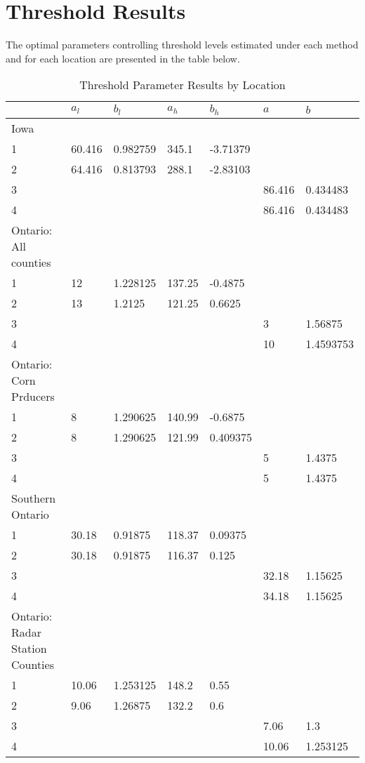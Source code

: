 \section{Threshold Results}

The optimal parameters controlling threshold levels estimated under each method and for each location are presented in the table below. 


\begin{table}[H]
\caption{Threshold Parameter Results by Location}
\label{my-label}
\begin{tabular}{lllllll}
\hline
 & $a_l$ & $b_l$ & $a_h$ & $b_h$ & $a$ & $b$ \\
\hline
 Iowa & & & & & & \\
\hline
1  & 60.416  & 0.982759   & 345.1  & -3.71379    &  & \\
2  &  64.416 & 0.813793  & 288.1         & -2.83103     & &   \\
3  &  &   &          &      & 86.416 &   0.434483 \\
4   &  &   &          &      & 86.416 &   0.434483 \\
\hline
Ontario: All counties & & & & & & \\
\hline
1  & 12 &  1.228125   & 137.25   &  -0.4875    &  & \\
2  &  13 & 1.2125  & 121.25         & 0.6625     & &   \\
3  &  &   &          &      & 3 &  1.56875 \\
4   &  &   &          &      & 10 &   1.4593753 \\
\hline
 Ontario: Corn Prducers & & & & & & \\
\hline
1  & 8 &  1.290625   & 140.99    &  -0.6875   &  & \\
2  &  8 & 1.290625  & 121.99      & 0.409375     & &   \\
3  &  &   &          &      & 5 &  1.4375 \\
4   &  &   &          &      & 5 &   1.4375 \\
\hline
 Southern Ontario & & & & & & \\
\hline
1  & 30.18 & 0.91875   & 118.37    &  0.09375   &  & \\
2  &  30.18 & 0.91875  & 116.37     & 0.125     & &   \\
3  &  &   &          &      & 32.18 &  1.15625 \\
4   &  &   &          &      & 34.18 &   1.15625 \\
\hline
Ontario: Radar Station Counties & & & & & & \\
\hline
1  &  10.06 & 1.253125   & 148.2    &  0.55    &  & \\
2  &   9.06 & 1.26875  & 132.2     & 0.6      & &   \\
3  &  &   &          &      & 7.06 &  1.3 \\
4   &  &   &          &      & 10.06 &    1.253125 \\
\hline
\end{tabular}
\end{table}



